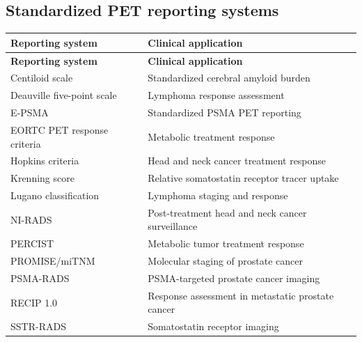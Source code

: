 \subsection{Standardized PET reporting systems}
\begin{longtable}{@{}p{}p{}@{}}
\toprule
\textbf{Reporting system} & \textbf{Clinical application} \\
\midrule
\endfirsthead
\toprule
\textbf{Reporting system} & \textbf{Clinical application} \\
\midrule
\endhead
Centiloid scale & Standardized cerebral amyloid burden \\
Deauville five-point scale & Lymphoma response assessment \\
E-PSMA & Standardized PSMA PET reporting \\
EORTC PET response criteria & Metabolic treatment response \\
Hopkins criteria & Head and neck cancer treatment response \\
Krenning score & Relative somatostatin receptor tracer uptake \\
Lugano classification & Lymphoma staging and response \\
NI-RADS & Post-treatment head and neck cancer surveillance \\
PERCIST & Metabolic tumor treatment response \\
PROMISE/miTNM & Molecular staging of prostate cancer \\
PSMA-RADS & PSMA-targeted prostate cancer imaging \\
RECIP 1.0 & Response assessment in metastatic prostate cancer \\
SSTR-RADS & Somatostatin receptor imaging \\
\bottomrule
\end{longtable}

